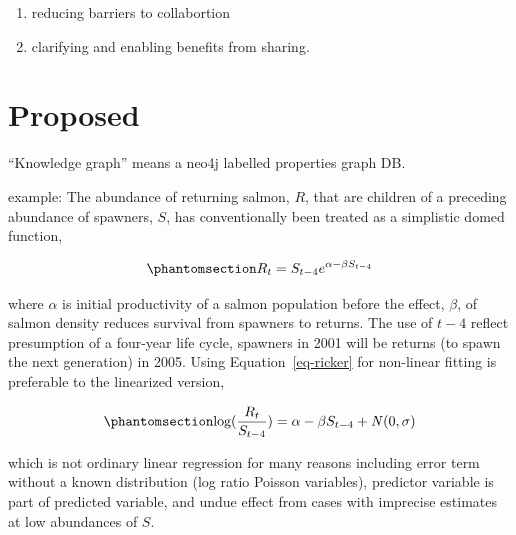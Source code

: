 \documentclass[
]{agujournal2019}
\begin{document}
\begin{enumerate}
\def\labelenumi{\arabic{enumi}.}
\item
  reducing barriers to collabortion
\item
  clarifying and enabling benefits from sharing.
\end{enumerate}

\section{Proposed}\label{proposed}

``Knowledge graph'' means a neo4j labelled properties graph DB.

example: The abundance of returning salmon, \(R\), that are children of
a preceding abundance of spawners, \(S\), has conventionally been
treated as a simplistic domed function,

\begin{equation}\phantomsection\label{eq-ricker}{
R_t = S_{t-4} e^{\alpha-\beta S_{t-4}}
}\end{equation}

where \(\alpha\) is initial productivity of a salmon population before
the effect, \(\beta\), of salmon density reduces survival from spawners
to returns. The use of \(t-4\) reflect presumption of a four-year life
cycle, spawners in 2001 will be returns (to spawn the next generation)
in 2005. Using Equation~\ref{eq-ricker} for non-linear fitting is
preferable to the linearized version,

\begin{equation}\phantomsection\label{eq-OLR_Ricker}{
\text{log}(\frac{R_t}{S_{t-4}}) = \alpha - \beta S_{t-4} + \mathit{N}(0,\sigma)
}\end{equation}

which is not ordinary linear regression for many reasons including error
term without a known distribution (log ratio Poisson variables),
predictor variable is part of predicted variable, and undue effect from
cases with imprecise estimates at low abundances of \(S\).
\end{document}
